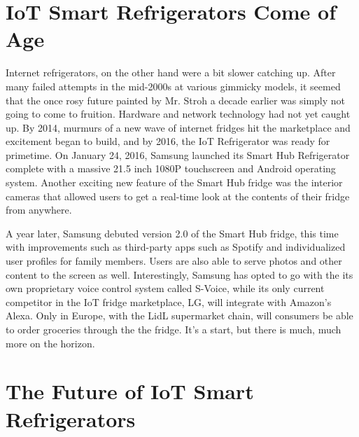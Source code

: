 \documentclass[sigconf]{acmart}
\begin{document}
\section{IoT Smart Refrigerators Come of Age}

Internet refrigerators, on the other hand were a bit slower catching up. After many failed attempts in the mid-2000s at various gimmicky models, it seemed that the once rosy future painted by Mr. Stroh a decade earlier was simply not going to come to fruition. Hardware and network technology had not yet caught up. By 2014, murmurs of a new wave of internet fridges hit the marketplace and excitement began to build, and by 2016, the IoT Refrigerator was ready for primetime. On January 24, 2016, Samsung launched its Smart Hub Refrigerator complete with a massive 21.5 inch 1080P touchscreen and Android operating system. Another exciting new feature of the Smart Hub fridge was the interior cameras that allowed users to get a real-time look at the contents of their fridge from anywhere\cite{PocketLint2016}.
\par
A year later, Samsung debuted version 2.0 of the Smart Hub fridge, this time with improvements such as third-party apps such as Spotify and individualized user profiles for family members. Users are also able to serve photos and other content to the screen as well. Interestingly, Samsung has opted to go with the its own proprietary voice control system called S-Voice, while its only current competitor in the IoT fridge marketplace, LG, will integrate with Amazon's Alexa. Only in Europe, with the LidL supermarket chain, will consumers be able to order groceries through the the fridge. It's a start, but there is much, much more on the horizon\cite{PocketLint2017}.

\section{The Future of IoT Smart Refrigerators}
\end{document}
